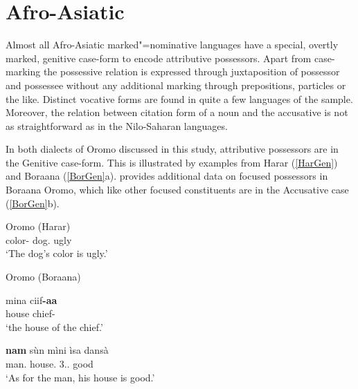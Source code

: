 \section{Afro-Asiatic}\label{ExtraAfro}

Almost all Afro-Asiatic marked"=nominative languages have a special, overtly marked, genitive case-form to encode attributive possessors.
Apart from case-marking the possessive relation is expressed through juxtaposition of possessor and possessee without any additional marking through prepositions, particles or the like. 
Distinct vocative forms are found in quite a few languages of the sample. 
Moreover, the relation between citation form of a noun and the accusative is not as straightforward as in the Nilo-Saharan languages.


In both dialects of Oromo discussed in this study, attributive possessors are in the Genitive case-form. 
This is illustrated by examples from Harar (\ref{HarGen}) and Boraana (\ref{BorGen}a). 
\citet[50]{Owens:1982} provides additional data on focused possessors in Boraana Oromo, which like other focused constituents are in the Accusative case (\ref{BorGen}b). 


\begin{exe}\ex\label{HarGen} {Oromo (Harar)}  \citep[Eastern Cushitic; Ethiopia; ][103]{Owens:1985}\nopagebreak[4]
\gll{} \textbf{} \\
color-\nom{} dog.\gen{} ugly\\
`The dog's color is ugly.'
\end{exe}


\begin{exe}\ex\label{BorGen} {Oromo (Boraana)} \citetext{Eastern Cushitic; Ethiopia; \citealt[35]{Stroomer:1995} \citealt[50]{Owens:1982}}\nopagebreak[4] %
\begin{xlist}
\ex\gll mina ciif\textbf{-aa}\\
house chief-\gen{}\\
`the house of the chief.'

\ex\gll \textbf{nam} s\`un m\`ini \`isa dans\`a\\
man.\acc{} \dem{} house.\acc{} 3\sg{}.\mas{}.\poss{} good\\
`As for the man, his house is good.' %
\end{xlist}
\end{exe} 


